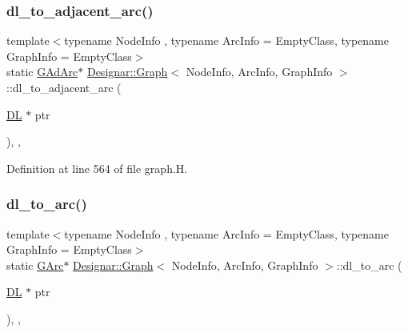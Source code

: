 \mbox{\label{class_designar_1_1_graph_afb508b7f8616948cc46c33deddcfaa4c}} 
\subsubsection{\texorpdfstring{dl\+\_\+to\+\_\+adjacent\+\_\+arc()}{dl\_to\_adjacent\_arc()}}
{\footnotesize\ttfamily template$<$typename Node\+Info , typename Arc\+Info  = Empty\+Class, typename Graph\+Info  = Empty\+Class$>$ \\
static \hyperlink{class_designar_1_1_graph_a7d00558995946c5653522148b54971bc}{G\+Ad\+Arc}$\ast$ \hyperlink{class_designar_1_1_graph}{Designar\+::\+Graph}$<$ Node\+Info, Arc\+Info, Graph\+Info $>$\+::dl\+\_\+to\+\_\+adjacent\+\_\+arc (\begin{DoxyParamCaption}\item[{\hyperlink{class_designar_1_1_d_l}{DL} $\ast$}]{ptr }\end{DoxyParamCaption})\hspace{0.3cm}{\ttfamily [inline]}, {\ttfamily [static]}, {\ttfamily [protected]}}



Definition at line 564 of file graph.\+H.

\mbox{\label{class_designar_1_1_graph_a543b3279c059a0ee596a56a704ab7825}} 
\subsubsection{\texorpdfstring{dl\+\_\+to\+\_\+arc()}{dl\_to\_arc()}}
{\footnotesize\ttfamily template$<$typename Node\+Info , typename Arc\+Info  = Empty\+Class, typename Graph\+Info  = Empty\+Class$>$ \\
static \hyperlink{class_designar_1_1_graph_a5ad9e18b71899c2d4979426e367e5573}{G\+Arc}$\ast$ \hyperlink{class_designar_1_1_graph}{Designar\+::\+Graph}$<$ Node\+Info, Arc\+Info, Graph\+Info $>$\+::dl\+\_\+to\+\_\+arc (\begin{DoxyParamCaption}\item[{\hyperlink{class_designar_1_1_d_l}{DL} $\ast$}]{ptr }\end{DoxyParamCaption})\hspace{0.3cm}{\ttfamily [inline]}, {\ttfamily [static]}, {\ttfamily [protected]}}



